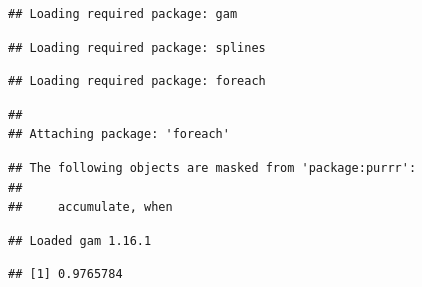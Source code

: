 \documentclass[
]{article}
\newenvironment{Shaded}{\begin{snugshade}}{\end{snugshade}}
\newcommand{\CommentTok}[1]{\textcolor[rgb]{0.00,0.40,1.00}{\textbf{\textit{#1}}}}
\newcommand{\DataTypeTok}[1]{\textcolor[rgb]{0.74,0.68,0.62}{\underline{#1}}}
\newcommand{\KeywordTok}[1]{\textcolor[rgb]{0.26,0.66,0.93}{\textbf{#1}}}
\newcommand{\NormalTok}[1]{\textcolor[rgb]{0.74,0.68,0.62}{#1}}
\newcommand{\OperatorTok}[1]{\textcolor[rgb]{0.74,0.68,0.62}{#1}}
\newcommand{\StringTok}[1]{\textcolor[rgb]{0.02,0.61,0.04}{#1}}
\begin{document}
\begin{verbatim}
## Loading required package: gam
\end{verbatim}

\begin{verbatim}
## Loading required package: splines
\end{verbatim}

\begin{verbatim}
## Loading required package: foreach
\end{verbatim}

\begin{verbatim}
## 
## Attaching package: 'foreach'
\end{verbatim}

\begin{verbatim}
## The following objects are masked from 'package:purrr':
## 
##     accumulate, when
\end{verbatim}

\begin{verbatim}
## Loaded gam 1.16.1
\end{verbatim}

\begin{Shaded}
\end{Shaded}

\begin{verbatim}
## [1] 0.9765784
\end{verbatim}

\begin{Shaded}
\end{Shaded}
\end{document}
